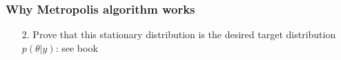 \documentclass[10pt]{beamer}
\begin{document}
\begin{frame}

\frametitle{ Why Metropolis algorithm works}

  \begin{itemize}
  \item[2.] Prove that this stationary distribution is the desired target distribution $p(\theta|y)$: see book
  \end{itemize}

\end{frame}
\end{document}
